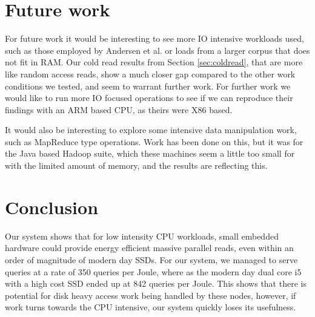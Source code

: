 
\clearpage
\section{Future work}
\label{sec:future}
For future work it would be interesting to see more IO intensive workloads used, such as those employed by Andersen et al.\cite{fawn} or loads from a larger corpus that does not fit in RAM.
Our cold read results from Section \ref{sec:coldread}, that are more like random access reads, show a much closer gap compared to the other work conditions we tested, and seem to warrant further work.
For further work we would like to run more IO focused operations to see if we can reproduce their findings with an ARM based CPU, as theirs were X86 based.

It would also be interesting to explore some intensive data manipulation work, such as MapReduce type operations.
Work has been done on this, but it was for the Java based Hadoop suite, which these machines seem a little too small for with the limited amount of memory, and the results are reflecting this.

\clearpage
\section{Conclusion}
\label{sec:conclusion}
Our system shows that for low intensity CPU workloads, small embedded hardware could provide energy efficient massive parallel reads, even within an order of magnitude of modern day SSDs.
For our system, we managed to serve queries at a rate of 350 queries per Joule, where as the modern day dual core i5 with a high cost SSD ended up at 842 queries per Joule.
This shows that there is potential for disk heavy access work being handled by these nodes, however, if work turns towards the CPU intensive, our system quickly loses its usefulness.

